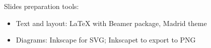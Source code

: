 



\begin{frame}

\begin{center}

\vspace*{15ex}

\begin{minipage}{0.5\textwidth}\scriptsize
  Slides preparation tools:
  \begin{itemize}
   \item Text and layout: LaTeX with Beamer package, Madrid theme
   \item Diagrams: Inkscape for SVG; Inkscapet to export to PNG
  \end{itemize}
\end{minipage}

\end{center}

\end{frame}

